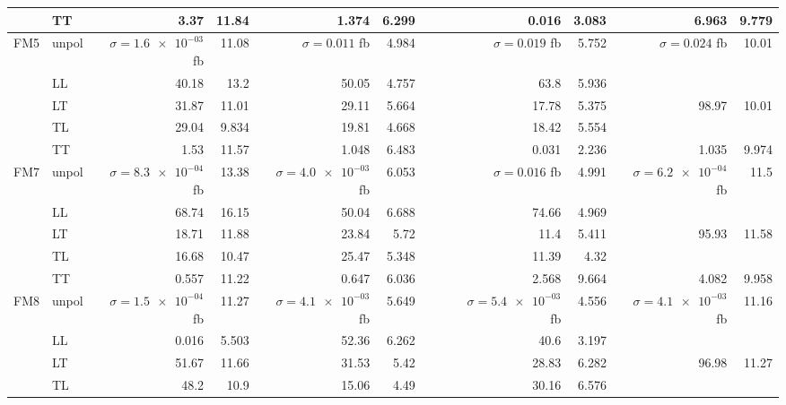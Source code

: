 \begin{table}[H]
{\begin{tabular}{llrrrrrrrrrr}
 & TT & \num{3.37} & \num{11.84} & \num{1.374} & \num{6.299} &  &  & \num{0.016} & \num{3.083} & \num{6.963} & \num{9.779} \\
\midrule
\multirow{5}{*}{FM5}
 & unpol & $\sigma = \num{1.6e-03}$ fb & \num{11.08} & $\sigma = \num{0.011}$ fb & \num{4.984} &  &  & $\sigma = \num{0.019}$ fb & \num{5.752} & $\sigma = \num{0.024}$ fb & \num{10.01} \\
 & LL & \num{40.18} & \num{13.2} & \num{50.05} & \num{4.757} &  &  & \num{63.8} & \num{5.936} &  &  \\
 & LT & \num{31.87} & \num{11.01} & \num{29.11} & \num{5.664} &  &  & \num{17.78} & \num{5.375} & \num{98.97} & \num{10.01} \\
 & TL & \num{29.04} & \num{9.834} & \num{19.81} & \num{4.668} &  &  & \num{18.42} & \num{5.554} &  &  \\
 & TT & \num{1.53} & \num{11.57} & \num{1.048} & \num{6.483} &  &  & \num{0.031} & \num{2.236} & \num{1.035} & \num{9.974} \\
\midrule
\multirow{5}{*}{FM7}
 & unpol & $\sigma = \num{8.3e-04}$ fb & \num{13.38} & $\sigma = \num{4.0e-03}$ fb & \num{6.053} &  &  & $\sigma = \num{0.016}$ fb & \num{4.991} & $\sigma = \num{6.2e-04}$ fb & \num{11.5} \\
 & LL & \num{68.74} & \num{16.15} & \num{50.04} & \num{6.688} &  &  & \num{74.66} & \num{4.969} &  &  \\
 & LT & \num{18.71} & \num{11.88} & \num{23.84} & \num{5.72} &  &  & \num{11.4} & \num{5.411} & \num{95.93} & \num{11.58} \\
 & TL & \num{16.68} & \num{10.47} & \num{25.47} & \num{5.348} &  &  & \num{11.39} & \num{4.32} &  &  \\
 & TT & \num{0.557} & \num{11.22} & \num{0.647} & \num{6.036} &  &  & \num{2.568} & \num{9.664} & \num{4.082} & \num{9.958} \\
\midrule
\multirow{5}{*}{FM8}
 & unpol & $\sigma = \num{1.5e-04}$ fb & \num{11.27} & $\sigma = \num{4.1e-03}$ fb & \num{5.649} &  &  & $\sigma = \num{5.4e-03}$ fb & \num{4.556} & $\sigma = \num{4.1e-03}$ fb & \num{11.16} \\
 & LL & \num{0.016} & \num{5.503} & \num{52.36} & \num{6.262} &  &  & \num{40.6} & \num{3.197} &  &  \\
 & LT & \num{51.67} & \num{11.66} & \num{31.53} & \num{5.42} &  &  & \num{28.83} & \num{6.282} & \num{96.98} & \num{11.27} \\
 & TL & \num{48.2} & \num{10.9} & \num{15.06} & \num{4.49} &  &  & \num{30.16} & \num{6.576} &  &  \\

\end{tabular}}
\end{table}

